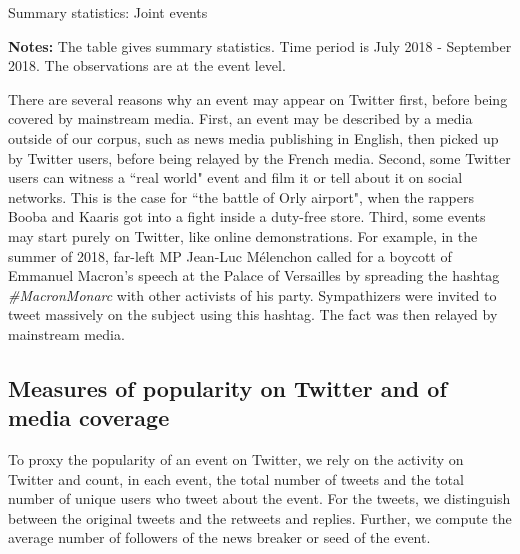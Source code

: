 \begin{table}
\caption{Summary statistics: Joint events\label{Tab:table_summary_joint_events}}
\begin{center}

\end{center}
\begin{spacing}{0.5}
{\fns \textbf{Notes:} The table gives summary statistics. Time period is July 2018 - September 2018. The observations are at the event level.}
\end{spacing}
\end{table} 



There are several reasons why an event may appear on Twitter first, before being covered by mainstream media. First, an event may be described by a media outside of our corpus, such as news media publishing in English, then picked up by Twitter users, before being relayed by the French media. Second, some Twitter users can witness a ``real world" event and film it or tell about it on social networks. This is the case for ``the battle of Orly airport", when the rappers Booba and Kaaris got into a fight inside a duty-free store. Third, some events may start purely on Twitter, like online demonstrations. For example, in the summer of 2018, far-left MP Jean-Luc Mélenchon called for a boycott of Emmanuel Macron's speech at the Palace of Versailles by spreading the hashtag \textit{\#MacronMonarc} with other activists of his party. Sympathizers were invited to tweet massively on the subject using this hashtag. The fact was then relayed by mainstream media.



\subsection{Measures of popularity on Twitter and of media coverage}

To proxy the popularity of an event on Twitter, we rely on the activity on Twitter and count, in each event, the total number of tweets and the total number of unique users who tweet about the event. For the tweets, we distinguish between the original tweets and the retweets and replies. Further, we compute the average number of followers of the news breaker or seed of the event.

